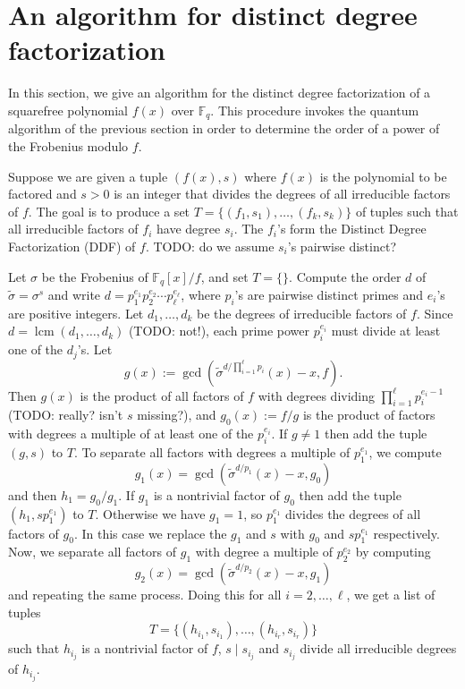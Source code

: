 \documentclass{article}
\theoremstyle{plain}
\theoremstyle{definition}
\DeclareMathOperator{\lcm}{lcm} %
\def\F{\ensuremath{\mathbb{F}}}
\begin{document}

\section{An algorithm for distinct degree factorization}

In this section, we give an algorithm for the distinct degree
factorization of a squarefree polynomial $f(x)$ over $\F_q$. This
procedure invokes the quantum algorithm of the previous section in
order to determine the order of a power of the Frobenius modulo $f$.

Suppose we are given a tuple $(f(x), s)$ where $f(x)$ is the
polynomial to be factored and $s > 0$ is an integer that divides the
degrees of all irreducible factors of $f$. The goal is to produce a
set $T = \{ (f_1, s_1), \dots, (f_k, s_k) \}$ of tuples such that all
irreducible factors of $f_i$ have degree $s_i$. The $f_i$'s form the
Distinct Degree Factorization (DDF) of $f$. TODO: do we assume $s_i$'s
pairwise distinct?

Let $\sigma$ be the Frobenius of $\F_q[x] / f$, and set $T =
\{\}$. Compute the order $d$ of $\tilde{\sigma} = \sigma^s$ and write
$d = p_1^{e_1} p_2^{e_2} \cdots p_\ell^{e_\ell}$, where $p_i$'s are
pairwise distinct primes and $e_i$'s are positive integers. Let $d_1, \dots,
d_k$ be the degrees of irreducible factors of $f$. Since $d =
\lcm(d_1, \dots, d_k)$ (TODO: not!), each prime power $p_i^{e_i}$ must divide at
least one of the $d_j$'s. Let
\[ g(x) := \gcd(\tilde{\sigma}^{d / \prod_{i = 1}^\ell p_i}(x) - x, f). \]
Then $g(x)$ is the product of all factors of $f$ with degrees dividing $\prod_{i = 1}^\ell p_i^{e_i 
- 1}$ (TODO: really? isn't $s$ missing?), and $g_0(x) := f / g$ is the product of factors with degrees a multiple of at least one of 
the $p_i^{e_i}$. If $g \ne 1$ then add the tuple $(g, s)$ to $T$. To separate all factors with 
degrees a multiple of $p_1^{e_1}$, we compute
\[ g_1(x) = \gcd(\tilde{\sigma}^{d / p_1}(x) - x, g_0) \]
and then $h_1 = g_0 / g_1$. If $g_1$ is a nontrivial factor of $g_0$ then add the tuple $(h_1, 
sp_1^{e_1})$ to $T$. Otherwise we have $g_1 = 1$, so $p_1^{e_1}$ divides the degrees of all factors 
of $g_0$. In this case we replace the $g_1$ and $s$ with $g_0$ and $sp_1^{e_1}$ respectively. Now, 
we separate all factors of $g_1$ with degree a multiple of $p_2^{e_2}$ by computing
\[ g_2(x) = \gcd(\tilde{\sigma}^{d / p_2}(x) - x, g_1) \]
and repeating the same process. Doing this for all $i = 2, \dots, \ell$, we get a list of tuples
\begin{equation}
\label{equ:tuple}
	T = \{ (h_{i_1}, s_{i_1}), \dots, (h_{i_r}, s_{i_r}) \}
\end{equation}
such that $h_{i_j}$ is a nontrivial factor of $f$, $s \mid s_{i_j}$ and $s_{i_j}$ divide all 
irreducible degrees of $h_{i_j}$.
\end{document}
